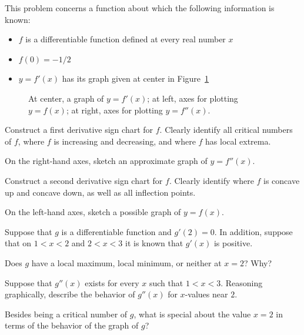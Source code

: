 \begin{exercises} 
\item This problem concerns a function about which the following information is known:
\begin{itemize}
	\item $f$ is a differentiable function defined at every real number $x$
	\item $f(0) = -1/2$
	\item $y = f'(x)$ has its graph given at center in Figure~\ref{F:3.1.Ez1}
\end{itemize}
\begin{figure}[h]
\begin{center}
\end{center}
\caption{At center, a graph of $y = f'(x)$; at left, axes for plotting $y = f(x)$; at right, axes for plotting $y = f''(x)$.} \label{F:3.1.Ez1}
\end{figure}
\ba
	\item Construct a first derivative sign chart for $f$.  Clearly identify all critical numbers of $f$, where $f$ is increasing and decreasing, and where $f$ has local extrema.
	\item On the right-hand axes, sketch an approximate graph of $y = f''(x)$.
	\item Construct a second derivative sign chart for $f$.  Clearly identify where $f$ is concave up and concave down, as well as all inflection points.
	\item On the left-hand axes, sketch a possible graph of $y = f(x)$.
\ea

\item Suppose that $g$ is a differentiable function and $g'(2) = 0$.  In addition, suppose that on $1 < x< 2$ and $2 < x < 3$ it is known that $g'(x)$ is positive.
\ba
	\item Does $g$ have a local maximum, local minimum, or neither at $x = 2$?  Why?
	\item Suppose that $g''(x)$ exists for every $x$ such that $1 < x < 3$.  Reasoning graphically, describe the behavior of $g''(x)$ for $x$-values near $2$.
	\item Besides being a critical number of $g$, what is special about the value $x = 2$ in terms of the behavior of the graph of $g$?
\ea


\end{exercises}

